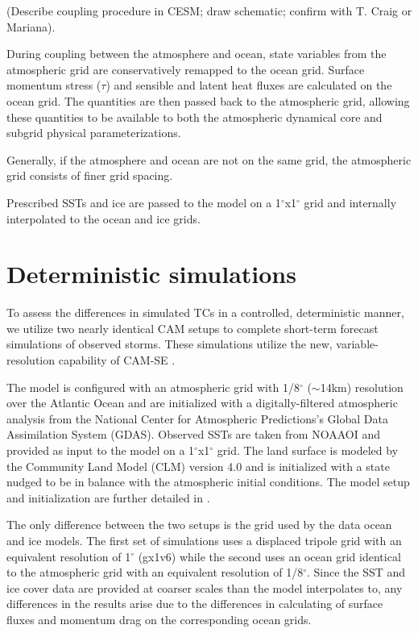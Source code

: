 \documentclass[draft,ms]{AGUTeX}
\newcommand{\degree}{$^{\circ}$}
\newcommand{\texttilde}{$\sim$}
\begin{document}
\begin{article}
{\color{red} (Describe coupling procedure in CESM; draw schematic; confirm with T. Craig or Mariana).}

During coupling between the atmosphere and ocean, state variables from the atmospheric grid are conservatively remapped to the ocean grid. Surface momentum stress ($\tau$) and sensible and latent heat fluxes are calculated on the ocean grid. The quantities are then passed back to the atmospheric grid, allowing these quantities to be available to both the atmospheric dynamical core and subgrid physical parameterizations.

Generally, if the atmosphere and ocean are not on the same grid, the atmospheric grid consists of finer grid spacing. 

Prescribed SSTs and ice are passed to the model on a 1\degree{}x1\degree{} grid and internally interpolated to the ocean and ice grids.

\section{Deterministic simulations}
\label{sec:forecast}

To assess the differences in simulated TCs in a controlled, deterministic manner, we utilize two nearly identical CAM setups to complete short-term forecast simulations of observed storms. These simulations utilize the new, variable-resolution capability of CAM-SE \citep{Zarzycki2014APE}.

The model is configured with an atmospheric grid with 1/8\degree{} (\texttilde{}14km) resolution over the Atlantic Ocean and are initialized with a digitally-filtered atmospheric analysis from the National Center for Atmospheric Predictions's Global Data Assimilation System (GDAS). Observed SSTs are taken from NOAAOI and provided as input to the model on a 1\degree{}x1\degree{} grid. The land surface is modeled by the Community Land Model (CLM) version 4.0 and is initialized with a state nudged to be in balance with the atmospheric initial conditions. The model setup and initialization are further detailed in \citet{Zarzycki2015TCForecast}.

The only difference between the two setups is the grid used by the data ocean and ice models. The first set of simulations uses a displaced tripole grid with an equivalent resolution of 1\degree{} (gx1v6) while the second uses an ocean grid identical to the atmospheric grid with an equivalent resolution of 1/8\degree{}. Since the SST and ice cover data are provided at coarser scales than the model interpolates to, any differences in the results arise due to the differences in calculating of surface fluxes and momentum drag on the corresponding ocean grids.


\end{article}
\end{document}

